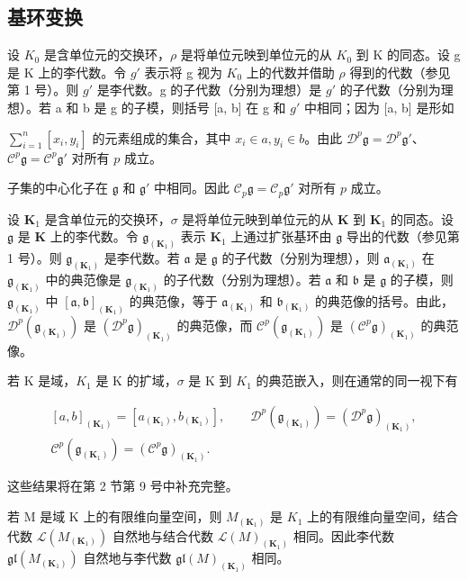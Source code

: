 \subsection{基环变换}

设 \(K_{0}\) 是含单位元的交换环，\(\rho\) 是将单位元映到单位元的从 \(K_{0}\) 到 K 的同态。设 g 是 K 上的李代数。令 \(g'\) 表示将 g 视为 \(K_{0}\) 上的代数并借助 \(\rho\) 得到的代数（参见第 1 号）。则 \(g'\) 是李代数。g 的子代数（分别为理想）是 \(g'\) 的子代数（分别为理想）。若 a 和 b 是 g 的子模，则括号 {[}a, b{]} 在 g 和 \(g'\) 中相同；因为 {[}a, b{]} 是形如

\(\sum_{i=1}^{n}\left[x_i,y_i\right]\) 的元素组成的集合，其中 \(x_{i}\in a,y_{i}\in b\)。由此 \(\mathcal{D}^p\mathfrak{g} = \mathcal{D}^p\mathfrak{g}'\)、\(\mathcal{C}^p\mathfrak{g} = \mathcal{C}^p\mathfrak{g}'\) 对所有 \(p\) 成立。

子集的中心化子在 \(\mathfrak{g}\) 和 \(\mathfrak{g}'\) 中相同。因此 \(\mathcal{C}_p\mathfrak{g} = \mathcal{C}_p\mathfrak{g}'\) 对所有 \(p\) 成立。

设 \(\mathbf{K}_1\) 是含单位元的交换环，\(\sigma\) 是将单位元映到单位元的从 \(\mathbf{K}\) 到 \(\mathbf{K}_1\) 的同态。设 \(\mathfrak{g}\) 是 \(\mathbf{K}\) 上的李代数。令 \(\mathfrak{g}_{(\mathbf{K}_1)}\) 表示 \(\mathbf{K}_1\) 上通过扩张基环由 \(\mathfrak{g}\) 导出的代数（参见第 1 号）。则 \(\mathfrak{g}_{(\mathbf{K}_1)}\) 是李代数。若 \(\mathfrak{a}\) 是 \(\mathfrak{g}\) 的子代数（分别为理想），则 \(\mathfrak{a}_{(\mathbf{K}_1)}\) 在 \(\mathfrak{g}_{(\mathbf{K}_1)}\) 中的典范像是 \(\mathfrak{g}_{(\mathbf{K}_1)}\) 的子代数（分别为理想）。若 \(\mathfrak{a}\) 和 \(\mathfrak{b}\) 是 \(\mathfrak{g}\) 的子模，则 \(\mathfrak{g}_{(\mathbf{K}_1)}\) 中 \([\mathfrak{a},\mathfrak{b}]_{(\mathbf{K}_1)}\) 的典范像，等于 \(\mathfrak{a}_{(\mathbf{K}_1)}\) 和 \(\mathfrak{b}_{(\mathbf{K}_1)}\) 的典范像的括号。由此，\(\mathcal{D}^p (\mathfrak{g}_{(\mathbf{K}_1)})\) 是 \((\mathcal{D}^p\mathfrak{g})_{(\mathbf{K}_1)}\) 的典范像，而 \(\mathcal{C}^p (\mathfrak{g}_{(\mathbf{K}_1)})\) 是 \((\mathcal{C}^p\mathfrak{g})_{(\mathbf{K}_1)}\) 的典范像。

若 K 是域，\(K_{1}\) 是 K 的扩域，\(\sigma\) 是 K 到 \(K_{1}\) 的典范嵌入，则在通常的同一视下有

\[
\begin{array}{c} [ a, b ] _ {(\mathbf {K} _ {1})} = [ a _ {(\mathbf {K} _ {1})}, b _ {(\mathbf {K} _ {1})} ], \qquad \mathcal {D} ^ {p} (\mathfrak {g} _ {(\mathbf {K} _ {1})}) = (\mathcal {D} ^ {p} \mathfrak {g}) _ {(\mathbf {K} _ {1})}, \\ \mathcal {C} ^ {p} (\mathfrak {g} _ {(\mathbf {K} _ {1})}) = (\mathcal {C} ^ {p} \mathfrak {g}) _ {(\mathbf {K} _ {1})}. \end{array}
\]

这些结果将在第 2 节第 9 号中补充完整。

若 M 是域 K 上的有限维向量空间，则 \(M_{(\mathbf{K}_{1})}\) 是 \(K_{1}\) 上的有限维向量空间，结合代数 \(\mathcal{L}(M_{(\mathbf{K}_{1})})\) 自然地与结合代数 \(\mathcal{L}(M)_{(\mathbf{K}_{1})}\) 相同。因此李代数 \(\mathfrak{gl}(M_{(\mathbf{K}_{1})})\) 自然地与李代数 \(\mathfrak{gl}(M)_{(\mathbf{K}_{1})}\) 相同。


